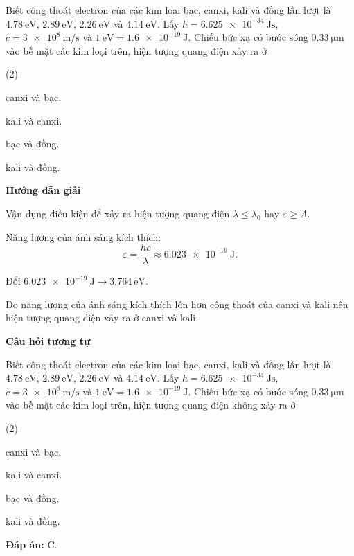 {Biết công thoát electron của các kim loại bạc, canxi, kali và đồng lần lượt là $\SI{4.78}{\electronvolt}$, $\SI{2.89}{\electronvolt}$, $\SI{2.26}{\electronvolt}$ và $\SI{4.14}{\electronvolt}$. Lấy $h=\SI{6.625e-34}{\joule \second}$, $c=\SI{3e8}{\meter / \second}$ và $\SI{1}{\electronvolt}=\SI{1.6e-19}{\joule}$. Chiếu bức xạ có bước sóng $\SI{0.33}{\micro \meter}$ vào bề mặt các kim loại trên, hiện tượng quang điện xảy ra ở
\begin{mcq}(2)
	\item canxi và bạc.
	\item kali và canxi.
	\item bạc và đồng.
	\item kali và đồng.
\end{mcq}
}{\begin{center}
	\textbf{Hướng dẫn giải}
\end{center}

Vận dụng điều kiện để xảy ra hiện tượng quang điện $\lambda \leq \lambda_0$ hay $\varepsilon \geq A$.

Năng lượng của ánh sáng kích thích:
\begin{equation*}
	\varepsilon = \dfrac{hc}{\lambda} \approx \SI{6.023e-19}{\joule}.
\end{equation*}

Đổi $\SI{6.023e-19}{\joule} \rightarrow \SI{3.764}{\electronvolt}$.

Do năng lượng của ánh sáng kích thích lớn hơn công thoát của canxi và kali nên hiện tượng quang điện xảy ra ở canxi và kali.

\begin{center}
	\textbf{Câu hỏi tương tự}
\end{center}

Biết công thoát electron của các kim loại bạc, canxi, kali và đồng lần lượt là $\SI{4.78}{\electronvolt}$, $\SI{2.89}{\electronvolt}$, $\SI{2.26}{\electronvolt}$ và $\SI{4.14}{\electronvolt}$. Lấy $h=\SI{6.625e-34}{\joule \second}$, $c=\SI{3e8}{\meter / \second}$ và $\SI{1}{\electronvolt}=\SI{1.6e-19}{\joule}$. Chiếu bức xạ có bước sóng $\SI{0.33}{\micro \meter}$ vào bề mặt các kim loại trên, hiện tượng quang điện không xảy ra ở
\begin{mcq}(2)
	\item canxi và bạc.
	\item kali và canxi.
	\item bạc và đồng.
	\item kali và đồng.
\end{mcq}

\textbf{Đáp án:} C.}